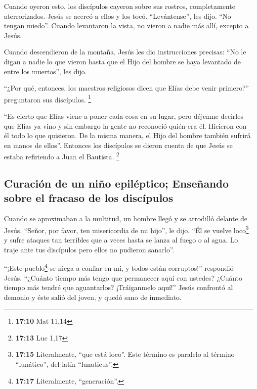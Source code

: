  Cuando oyeron esto, los discípulos cayeron sobre sus
rostros, completamente aterrorizados.  Jesús se acercó a
ellos y los tocó. ``Levántense'', les dijo. ``No tengan miedo''.
 Cuando levantaron la vista, no vieron a nadie más allí,
excepto a Jesús.

 Cuando descendieron de la montaña, Jesús les dio
instrucciones precisas: ``No le digan a nadie lo que vieron hasta que el
Hijo del hombre se haya levantado de entre los muertos'', les dijo.

 ``¿Por qué, entonces, los maestros religiosos dicen que
Elías debe venir primero?'' preguntaron sus discípulos. \footnote{\textbf{17:10}
  Mat 11,14}

 ``Es cierto que Elías viene a poner cada cosa en su
lugar,  pero déjenme decirles que Elías ya vino y sin
embargo la gente no reconoció quién era él. Hicieron con él todo lo que
quisieron. De la misma manera, el Hijo del hombre también sufrirá en
manos de ellos''.  Entonces los discípulos se dieron
cuenta de que Jesús se estaba refiriendo a Juan el Bautista. \footnote{\textbf{17:13}
  Luc 1,17}

\hypertarget{curaciuxf3n-de-un-niuxf1o-epiluxe9ptico-enseuxf1ando-sobre-el-fracaso-de-los-discuxedpulos}{%
\subsection{Curación de un niño epiléptico; Enseñando sobre el fracaso
de los
discípulos}\label{curaciuxf3n-de-un-niuxf1o-epiluxe9ptico-enseuxf1ando-sobre-el-fracaso-de-los-discuxedpulos}}

 Cuando se aproximaban a la multitud, un hombre llegó y
se arrodilló delante de Jesús.  ``Señor, por favor, ten
misericordia de mi hijo'', le dijo. ``Él se vuelve loco\footnote{\textbf{17:15}
  Literalmente, ``que está loco''. Este término es paralelo al término
  ``lunático'', del latín ``lunaticus''.} y sufre ataques tan terribles
que a veces hasta se lanza al fuego o al agua.  Lo traje
ante tus discípulos pero ellos no pudieron sanarlo''.

 ``¡Este pueblo\footnote{\textbf{17:17} Literalmente,
  ``generación''.} se niega a confiar en mi, y todos están corruptos!''
respondió Jesús. ``¿Cuánto tiempo más tengo que permanecer aquí con
ustedes? ¿Cuánto tiempo más tendré que aguantarlos? ¡Tráiganmelo aquí!''
 Jesús confrontó al demonio y éste salió del joven, y
quedó sano de inmediato.

